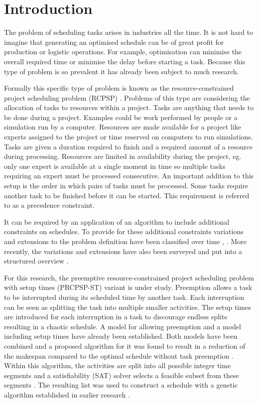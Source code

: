 \section{Introduction} \label{section:introduction}
The problem of scheduling tasks arises in industries all the time. It is not hard to imagine that generating an optimised schedule can be of great profit for production or logistic operations. For example, optimisation can minimise the overall required time or minimise the delay before starting a task. Because this type of problem is so prevalent it has already been subject to much research.

Formally this specific type of problem is known as the resource-constrained project scheduling problem (RCPSP) \cite{RN69, RN66, RN70}. Problems of this type are considering the allocation of tasks to resources within a project. Tasks are anything that needs to be done during a project. Examples could be work performed by people or a simulation run by a computer. Resources are made available for a project like experts assigned to the project or time reserved on computers to run simulations. Tasks are given a duration required to finish and a required amount of a resource during processing. Resources are limited in availability during the project, eg. only one expert is available at a single moment in time so multiple tasks requiring an expert must be processed consecutive. An important addition to this setup is the order in which pairs of tasks must be processed. Some tasks require another task to be finished before it can be started. This requirement is referred to as a precedence constraint.

It can be required by an application of an algorithm to include additional constraints on schedules. To provide for these additional constraints variations and extensions to the problem definition have been classified over time \cite{RN9}, \cite{RN10}. More recently, the variations and extensions have also been surveyed and put into a structured overview \cite{RN6}.


For this research, the preemptive resource-constrained project scheduling problem with setup times (PRCPSP-ST) variant is under study. Preemption allows a task to be interrupted during its scheduled time by another task. Each interruption can be seen as splitting the task into multiple smaller activities. The setup times are introduced for each interruption in a task to discourage endless splits resulting in a chaotic schedule. A model for allowing preemption \cite{RN21} and a model including setup times \cite{RN13} have already been established. Both models have been combined and a proposed algorithm for it was found to result in a reduction of the makespan compared to the optimal schedule without task preemption \cite{RN1}. Within this algorithm, the activities are split into all possible integer time segments and a satisfiability (SAT) solver selects a feasible subset from these segments \cite{RN3}. The resulting list was used to construct a schedule with a genetic algorithm established in earlier research \cite{RN14}.

